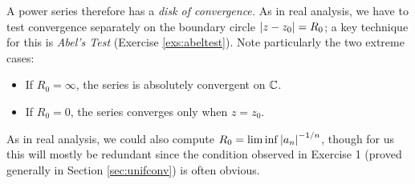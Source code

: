 A power series therefore has a \emph{disk of convergence.} As in real analysis, we have to test convergence separately on the boundary circle $\left| z-z_0\right|=R_0$; a key technique for this is \emph{Abel's Test} (Exercise \ref{exs:abeltest}). Note particularly the two extreme cases:
\begin{itemize}%
	\item If $R_0=\infty$, the series is absolutely convergent on $\mathbb{C}$.
	\item If $R_0=0$, the series converges only when $z=z_0$.
\end{itemize}
As in real analysis, we could also compute $R_0=\liminf\left| a_n\right|^{-1/n}$, though for us this will mostly be redundant since the condition observed in Exercise 1 (proved generally in Section \ref{sec:unifconv}) is often obvious. %

